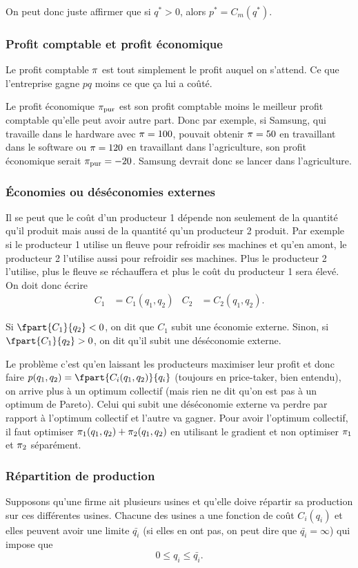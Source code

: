 On peut donc juste affirmer que si $q^* > 0$, alors $p^* = C_m(q^*)$.

\subsubsection{Profit comptable et profit économique}
Le profit comptable $\pi$ est tout simplement le profit auquel on s'attend.
Ce que l'entreprise gagne $pq$ moins ce que ça lui a coûté.

Le profit économique $\pi_{\mathrm{pur}}$ est son profit comptable moins le meilleur
profit comptable qu'elle peut avoir autre part.
Donc par exemple, si Samsung, qui travaille dans le hardware avec
$\pi = 100$, pouvait obtenir $\pi = 50$ en travaillant dans le software ou
$\pi = 120$ en travaillant dans l'agriculture, son profit économique serait
$\pi_{\mathrm{pur}} = -20$. Samsung devrait donc se lancer dans l'agriculture.

\subsubsection{Économies ou déséconomies externes}
Il se peut que le coût d'un producteur 1 dépende non seulement de la quantité
qu'il produit mais aussi de la quantité qu'un producteur 2 produit.
Par exemple si le producteur 1 utilise un fleuve pour refroidir ses
machines et qu'en amont, le producteur 2 l'utilise aussi pour refroidir ses machines.
Plus le producteur 2 l'utilise, plus le fleuve se réchauffera et plus le
coût du producteur 1 sera élevé.
On doit donc écrire
\begin{align*}
  C_1 & = C_1(q_1, q_2) & C_2 & = C_2(q_1,q_2).
\end{align*}

Si $\fpart{C_1}{q_2} < 0$, on dit que $C_1$ subit une économie externe.
Sinon, si $\fpart{C_1}{q_2} > 0$, on dit qu'il subit une déséconomie
externe.

Le problème c'est qu'en laissant les producteurs maximiser leur profit
et donc faire $p(q_1, q_2) = \fpart{C_i(q_1, q_2)}{q_i}$
(toujours en price-taker, bien entendu),
on arrive plus à un optimum collectif
(mais rien ne dit qu'on est pas à un optimum de Pareto).
Celui qui subit une déséconomie externe va perdre par rapport à l'optimum
collectif et l'autre va gagner.
Pour avoir l'optimum collectif,
il faut optimiser $\pi_1(q_1, q_2) + \pi_2(q_1, q_2)$
en utilisant le gradient et
non optimiser $\pi_1$ et $\pi_2$ séparément.

\subsubsection{Répartition de production}
Supposons qu'une firme ait plusieurs usines et
qu'elle doive répartir sa production sur ces différentes usines.
Chacune des usines a une fonction de coût $C_i(q_i)$ et elles peuvent
avoir une limite $\bar{q_i}$
(si elles en ont pas, on peut dire que $\bar{q_i} = \infty$)
qui impose que
\[ 0 \leq q_i \leq \bar{q_i}. \]

